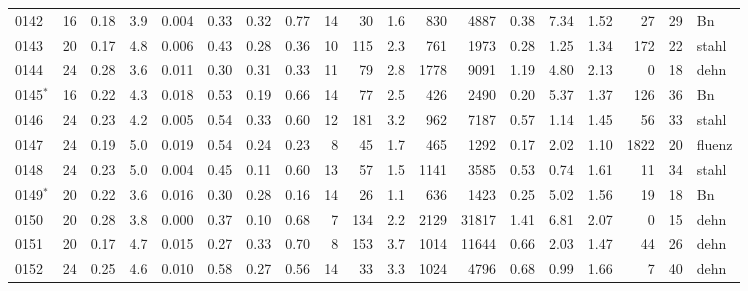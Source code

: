 {\begin{longtable}{@{}lrrrrrrrrrrrrrrrrrl@{}}
0142 & 16 & \num{0.18} & \num{3.9} & \num{0.004} & \num{0.33} & \num{0.32} & \num{0.77} & 14 & \num{30} & \num{1.6} & \num{830} & \num{4887} & \num{0.38} & \num{7.34} & \num{1.52} & \num{27} & \num{29} & Bn \\
0143 & 20 & \num{0.17} & \num{4.8} & \num{0.006} & \num{0.43} & \num{0.28} & \num{0.36} & 10 & \num{115} & \num{2.3} & \num{761} & \num{1973} & \num{0.28} & \num{1.25} & \num{1.34} & \num{172} & \num{22} & stahl \\
0144 & 24 & \num{0.28} & \num{3.6} & \num{0.011} & \num{0.30} & \num{0.31} & \num{0.33} & 11 & \num{79} & \num{2.8} & \num{1778} & \num{9091} & \num{1.19} & \num{4.80} & \num{2.13} & \num{0} & \num{18} & dehn \\
0145$^\ast$ & 16 & \num{0.22} & \num{4.3} & \num{0.018} & \num{0.53} & \num{0.19} & \num{0.66} & 14 & \num{77} & \num{2.5} & \num{426} & \num{2490} & \num{0.20} & \num{5.37} & \num{1.37} & \num{126} & \num{36} & Bn \\
0146 & 24 & \num{0.23} & \num{4.2} & \num{0.005} & \num{0.54} & \num{0.33} & \num{0.60} & 12 & \num{181} & \num{3.2} & \num{962} & \num{7187} & \num{0.57} & \num{1.14} & \num{1.45} & \num{56} & \num{33} & stahl \\
0147 & 24 & \num{0.19} & \num{5.0} & \num{0.019} & \num{0.54} & \num{0.24} & \num{0.23} & 8 & \num{45} & \num{1.7} & \num{465} & \num{1292} & \num{0.17} & \num{2.02} & \num{1.10} & \num{1822} & \num{20} & fluenz \\
0148 & 24 & \num{0.23} & \num{5.0} & \num{0.004} & \num{0.45} & \num{0.11} & \num{0.60} & 13 & \num{57} & \num{1.5} & \num{1141} & \num{3585} & \num{0.53} & \num{0.74} & \num{1.61} & \num{11} & \num{34} & stahl \\
0149$^\ast$ & 20 & \num{0.22} & \num{3.6} & \num{0.016} & \num{0.30} & \num{0.28} & \num{0.16} & 14 & \num{26} & \num{1.1} & \num{636} & \num{1423} & \num{0.25} & \num{5.02} & \num{1.56} & \num{19} & \num{18} & Bn \\
0150 & 20 & \num{0.28} & \num{3.8} & \num{0.000} & \num{0.37} & \num{0.10} & \num{0.68} & 7 & \num{134} & \num{2.2} & \num{2129} & \num{31817} & \num{1.41} & \num{6.81} & \num{2.07} & \num{0} & \num{15} & dehn \\
0151 & 20 & \num{0.17} & \num{4.7} & \num{0.015} & \num{0.27} & \num{0.33} & \num{0.70} & 8 & \num{153} & \num{3.7} & \num{1014} & \num{11644} & \num{0.66} & \num{2.03} & \num{1.47} & \num{44} & \num{26} & dehn \\
0152 & 24 & \num{0.25} & \num{4.6} & \num{0.010} & \num{0.58} & \num{0.27} & \num{0.56} & 14 & \num{33} & \num{3.3} & \num{1024} & \num{4796} & \num{0.68} & \num{0.99} & \num{1.66} & \num{7} & \num{40} & dehn \\

\end{longtable}}
